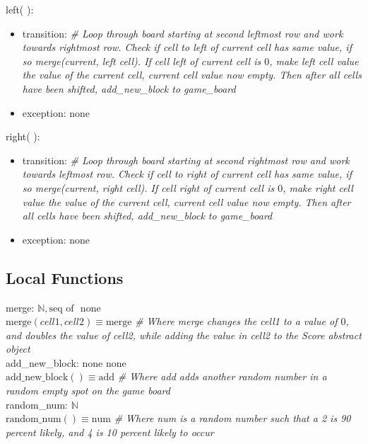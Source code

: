 \documentclass[12pt]{article}
\begin{document}
\noindent left( ):
\begin{itemize}
\item transition: \textit{\# Loop through board starting at second leftmost row and work towards rightmost row. Check if cell to left of current cell has same value, if so merge(current, left cell). If cell left of current cell is $0$, make left cell value the value of the current cell, current cell value now empty. Then after all cells have been shifted, add\_new\_block to game\_board} ~\\
\item exception: none
\end{itemize}

\noindent right( ):
\begin{itemize}
\item transition: \textit{\# Loop through board starting at second rightmost row and work towards leftmost row. Check if cell to right of current cell has same value, if so merge(current, right cell). If cell right of current cell is $0$, make right cell value the value of the current cell, current cell value now empty. Then after all cells have been shifted, add\_new\_block to game\_board} ~\\
\item exception: none
\end{itemize}

\subsection*{Local Functions}

\noindent merge:  $\mathbb{N}, \text{seq of } $ \rightarrow none \\
\noindent $\mbox{merge}(cell1, cell2) \equiv \text{merge} $
\textit{\# Where merge changes the cell1 to a value of $0$, and doubles the value of cell2, while adding the value in cell2 to the Score abstract object} ~\\

\noindent add\_new\_block: none \rightarrow none \\
\noindent $\mbox{add\_new\_block}() \equiv \text{add} $
\textit{\# Where add adds another random number in a random empty spot on the game board} ~\\

\noindent random\_num:  \rightarrow $\mathbb{N}$\\
\noindent $\mbox{random\_num}() \equiv \text{num} $
\textit{\# Where num is a random number such that a 2 is 90 percent likely, and 4 is 10 percent likely to occur} ~\\
\end{document}
